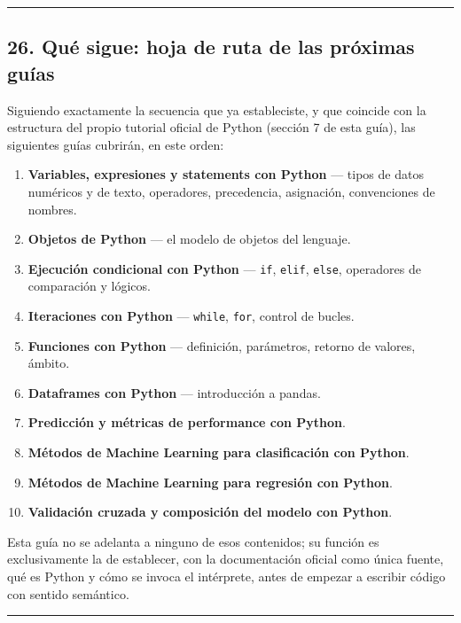\documentclass[
  doc,
  floatsintext,
  longtable,
  a4paper,
  nolmodern,
  notxfonts,
  notimes,
  12pt,
  colorlinks=true,linkcolor=blue,citecolor=blue,urlcolor=blue]{apa7}
\providecommand{\tightlist}{%
  \setlength{\itemsep}{0pt}\setlength{\parskip}{0pt}}
\begin{document}
\begin{center}\rule{0.5\linewidth}{0.5pt}\end{center}

\subsection{26. Qué sigue: hoja de ruta de las próximas
guías}\label{quuxe9-sigue-hoja-de-ruta-de-las-pruxf3ximas-guuxedas}

Siguiendo exactamente la secuencia que ya estableciste, y que coincide
con la estructura del propio tutorial oficial de Python (sección 7 de
esta guía), las siguientes guías cubrirán, en este orden:

\begin{enumerate}
\def\labelenumi{\arabic{enumi}.}
\tightlist
\item
  \textbf{Variables, expresiones y statements con Python} --- tipos de
  datos numéricos y de texto, operadores, precedencia, asignación,
  convenciones de nombres.
\item
  \textbf{Objetos de Python} --- el modelo de objetos del lenguaje.
\item
  \textbf{Ejecución condicional con Python} --- \texttt{if},
  \texttt{elif}, \texttt{else}, operadores de comparación y lógicos.
\item
  \textbf{Iteraciones con Python} --- \texttt{while}, \texttt{for},
  control de bucles.
\item
  \textbf{Funciones con Python} --- definición, parámetros, retorno de
  valores, ámbito.
\item
  \textbf{Dataframes con Python} --- introducción a pandas.
\item
  \textbf{Predicción y métricas de performance con Python}.
\item
  \textbf{Métodos de Machine Learning para clasificación con Python}.
\item
  \textbf{Métodos de Machine Learning para regresión con Python}.
\item
  \textbf{Validación cruzada y composición del modelo con Python}.
\end{enumerate}

Esta guía no se adelanta a ninguno de esos contenidos; su función es
exclusivamente la de establecer, con la documentación oficial como única
fuente, qué es Python y cómo se invoca el intérprete, antes de empezar a
escribir código con sentido semántico.

\begin{center}\rule{0.5\linewidth}{0.5pt}\end{center}
\end{document}
